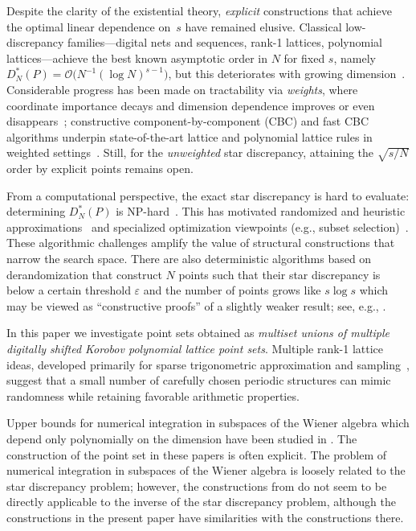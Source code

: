 \documentclass[12pt]{article}
\theoremstyle{definition}
\numberwithin{equation}{section}
\begin{document}
Despite the clarity of the existential theory, \emph{explicit} constructions that achieve the optimal linear dependence on~$s$ have remained elusive. Classical low-discrepancy families---digital nets and sequences, rank-1 lattices, polynomial lattices---achieve the best known asymptotic order in $N$ for fixed $s$, namely $D^*_N(P)=\mathcal{O}\bigl(N^{-1}(\log N)^{s-1}\bigr)$, but this deteriorates with growing dimension~\cite{DKP22,DKS13,DKP10,niesiam}. Considerable progress has been made on tractability via \emph{weights}, where coordinate importance decays and dimension dependence improves or even disappears~\cite{Aistleitner2014weights,HPS08}; constructive component-by-component (CBC) and fast CBC algorithms underpin state-of-the-art lattice and polynomial lattice rules in weighted settings~\cite{DKLP07,DKLS05,NC06a,NC06b}. Still, for the \emph{unweighted} star discrepancy, attaining the $\sqrt{s/N}$ order by explicit points remains open.

From a computational perspective, the exact star discrepancy is hard to evaluate: determining $D^*_N(P)$ is NP-hard~\cite{GSW09}. This has motivated randomized and heuristic approximations~\cite{Clément23GECCO,GWW12} and specialized optimization viewpoints (e.g., subset selection)~\cite{Clément22JCO}. These algorithmic challenges amplify the value of structural constructions that narrow the search space. There are also deterministic algorithms based on derandomization that construct $N$ points such that their star discrepancy is below a certain threshold $\varepsilon$ and the number of points grows like $s \log s$ which may be viewed as ``constructive proofs'' of a slightly weaker result; see, e.g., \cite{DGW10}.

\medskip
In this paper we investigate point sets obtained as \emph{multiset unions of multiple digitally shifted Korobov polynomial lattice point sets}. Multiple rank-1 lattice ideas, developed primarily for sparse trigonometric approximation and sampling~\cite{GIWV20,Kaemmerer18,KPV21}, suggest that a small number of carefully chosen periodic structures can mimic randomness while retaining favorable arithmetic properties. 

Upper bounds for numerical integration in subspaces of the Wiener algebra which depend only polynomially on the dimension have been studied in \cite{D14, DGS25, G23}. The construction of the point set in these papers is often explicit. The problem of numerical integration in subspaces of the Wiener algebra is loosely related to the star discrepancy problem; however, the constructions from \cite{D14, DGS25, G23} do not seem to be directly applicable to the inverse of the star discrepancy problem, although the constructions in the present paper have similarities with the constructions there.
\end{document}
